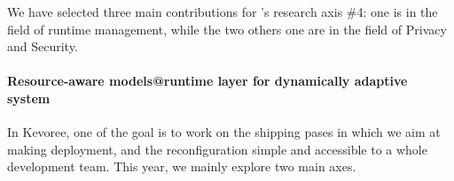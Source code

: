 We have selected three main contributions for \team's research axis \#4:
one is in the field of runtime management, while the two others one are in the field of Privacy and Security.



\paragraph{Resource-aware models@runtime layer for dynamically adaptive system}

In Kevoree, one of the goal is to work on the shipping pases in which we aim at making deployment, and the reconfiguration simple and accessible to a whole development team. This year, we mainly explore two main axes.

